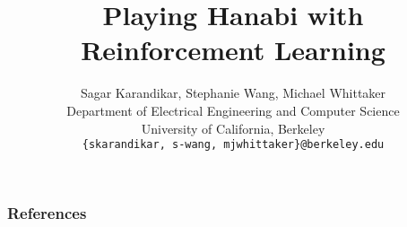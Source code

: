 \documentclass{article}
\title{Playing Hanabi with Reinforcement Learning}
\author{%
  Sagar Karandikar, Stephanie Wang, Michael Whittaker \\
  Department of Electrical Engineering and Computer Science \\
  University of California, Berkeley \\
  \texttt{\{skarandikar, s-wang, mjwhittaker\}@berkeley.edu} \\
}
\begin{document}
\maketitle

{}
{}
{}
{}
{}
{}
{}

\subsubsection*{References}


\end{document}
